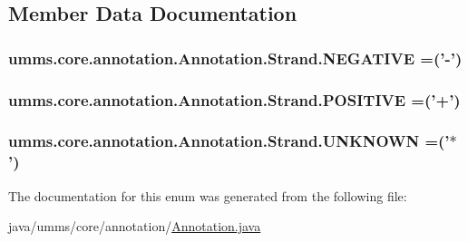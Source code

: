 \subsection{Member Data Documentation}
\hypertarget{enumumms_1_1core_1_1annotation_1_1_annotation_1_1_strand_a2b67589c3337d7e5628cb7f6af610f36}{
\subsubsection[{N\+E\+G\+A\+T\+I\+V\+E}]{\setlength{\rightskip}{0pt plus 5cm}umms.\+core.\+annotation.\+Annotation.\+Strand.\+N\+E\+G\+A\+T\+I\+V\+E =('-\/')}}\label{enumumms_1_1core_1_1annotation_1_1_annotation_1_1_strand_a2b67589c3337d7e5628cb7f6af610f36}
\hypertarget{enumumms_1_1core_1_1annotation_1_1_annotation_1_1_strand_abfdcbea1d9b4e07f252c332486b96eed}{
\subsubsection[{P\+O\+S\+I\+T\+I\+V\+E}]{\setlength{\rightskip}{0pt plus 5cm}umms.\+core.\+annotation.\+Annotation.\+Strand.\+P\+O\+S\+I\+T\+I\+V\+E =('+')}}\label{enumumms_1_1core_1_1annotation_1_1_annotation_1_1_strand_abfdcbea1d9b4e07f252c332486b96eed}
\hypertarget{enumumms_1_1core_1_1annotation_1_1_annotation_1_1_strand_a2f9cd36f5078c72c6447f8d7b062a22e}{
\subsubsection[{U\+N\+K\+N\+O\+W\+N}]{\setlength{\rightskip}{0pt plus 5cm}umms.\+core.\+annotation.\+Annotation.\+Strand.\+U\+N\+K\+N\+O\+W\+N =('$\ast$')}}\label{enumumms_1_1core_1_1annotation_1_1_annotation_1_1_strand_a2f9cd36f5078c72c6447f8d7b062a22e}


The documentation for this enum was generated from the following file\+:\begin{DoxyCompactItemize}
\item 
java/umms/core/annotation/\hyperlink{_annotation_8java}{Annotation.\+java}\end{DoxyCompactItemize}
